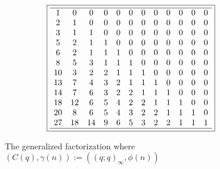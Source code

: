 \documentclass[10pt,reqno]{amsart}
\numberwithin{figure}{section}
\numberwithin{table}{section}
\theoremstyle{plain}
\numberwithin{theorem}{section}
\theoremstyle{remark}
\begin{document}
\begin{figure}[ht!]
\begin{minipage}{\linewidth} 
\begin{center} 
\tiny 
\begin{equation*} 
\boxed{ 
\begin{array}{cccccccccccccccccc} \hline 
 1 & 0 & 0 & 0 & 0 & 0 & 0 & 0 & 0 & 0 & 0 & 0 \\
 2 & 1 & 0 & 0 & 0 & 0 & 0 & 0 & 0 & 0 & 0 & 0 \\
 3 & 1 & 1 & 0 & 0 & 0 & 0 & 0 & 0 & 0 & 0 & 0 \\
 5 & 2 & 1 & 1 & 0 & 0 & 0 & 0 & 0 & 0 & 0 & 0 \\
 6 & 2 & 1 & 1 & 1 & 0 & 0 & 0 & 0 & 0 & 0 & 0 \\
 8 & 5 & 3 & 1 & 1 & 1 & 0 & 0 & 0 & 0 & 0 & 0 \\
 10 & 3 & 2 & 2 & 1 & 1 & 1 & 0 & 0 & 0 & 0 & 0 \\
 13 & 7 & 4 & 3 & 2 & 1 & 1 & 1 & 0 & 0 & 0 & 0 \\
 14 & 7 & 6 & 3 & 2 & 2 & 1 & 1 & 1 & 0 & 0 & 0 \\
 18 & 12 & 6 & 5 & 4 & 2 & 2 & 1 & 1 & 1 & 0 & 0 \\
 20 & 8 & 6 & 5 & 4 & 3 & 2 & 2 & 1 & 1 & 1 & 0 \\
 27 & 18 & 14 & 9 & 6 & 5 & 3 & 2 & 2 & 1 & 1 & 1 \\
 \hline 
\end{array}
} 
\end{equation*} 
\end{center} 
\end{minipage}

\caption{The generalized factorization where $(C(q), \gamma(n)) := ((q; q)_{\infty}, \phi(n))$} 
\label{figure_genfactpair_spcase_v1} 

\end{figure} 
\end{document}
